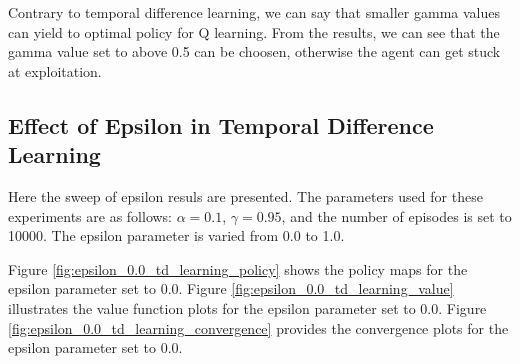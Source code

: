 \documentclass{assignment}
\begin{document}
Contrary to temporal difference learning, we can say that smaller gamma values can yield to optimal policy for Q learning. From the results, we can see that the gamma value set to above 0.5 can be choosen, otherwise the agent can get stuck at exploitation. 

\subsection{Effect of Epsilon in Temporal Difference Learning}

Here the sweep of epsilon resuls are presented. The parameters used for these experiments are as follows: $\alpha = 0.1$, $\gamma = 0.95$, and the number of episodes is set to 10000. The epsilon parameter is varied from 0.0 to 1.0. 

Figure \ref{fig:epsilon_0.0_td_learning_policy} shows the policy maps for the epsilon parameter set to 0.0. Figure \ref{fig:epsilon_0.0_td_learning_value} illustrates the value function plots for the epsilon parameter set to 0.0. Figure \ref{fig:epsilon_0.0_td_learning_convergence} provides the convergence plots for the epsilon parameter set to 0.0.
\end{document}
